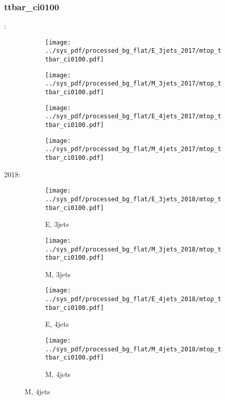 \documentclass{beamer}
\begin{document}
\begin{frame}
\frametitle{ttbar_ci0100}
\fontsize{5}{1}:
\begin{figure}
\centering
\begin{subfigure}[b]{0.24\textwidth}
\texttt{[image: ../sys\_pdf/processed\_bg\_flat/E\_3jets\_2017/mtop\_ttbar\_ci0100.pdf]}
\end{subfigure}
\begin{subfigure}[b]{0.24\textwidth}
\texttt{[image: ../sys\_pdf/processed\_bg\_flat/M\_3jets\_2017/mtop\_ttbar\_ci0100.pdf]}
\end{subfigure}
\begin{subfigure}[b]{0.24\textwidth}
\texttt{[image: ../sys\_pdf/processed\_bg\_flat/E\_4jets\_2017/mtop\_ttbar\_ci0100.pdf]}
\end{subfigure}
\begin{subfigure}[b]{0.24\textwidth}
\texttt{[image: ../sys\_pdf/processed\_bg\_flat/M\_4jets\_2017/mtop\_ttbar\_ci0100.pdf]}
\end{subfigure}
\end{figure}
2018:
\begin{figure}
\centering
\begin{subfigure}[b]{0.24\textwidth}
\texttt{[image: ../sys\_pdf/processed\_bg\_flat/E\_3jets\_2018/mtop\_ttbar\_ci0100.pdf]}
\captionsetup{font=tiny}
\caption{E, 3jets}
\end{subfigure}
\begin{subfigure}[b]{0.24\textwidth}
\texttt{[image: ../sys\_pdf/processed\_bg\_flat/M\_3jets\_2018/mtop\_ttbar\_ci0100.pdf]}
\captionsetup{font=tiny}
\caption{M, 3jets}
\end{subfigure}
\begin{subfigure}[b]{0.24\textwidth}
\texttt{[image: ../sys\_pdf/processed\_bg\_flat/E\_4jets\_2018/mtop\_ttbar\_ci0100.pdf]}
\captionsetup{font=tiny}
\caption{E, 4jets}
\end{subfigure}
\begin{subfigure}[b]{0.24\textwidth}
\texttt{[image: ../sys\_pdf/processed\_bg\_flat/M\_4jets\_2018/mtop\_ttbar\_ci0100.pdf]}
\captionsetup{font=tiny}
\caption{M, 4jets}
\end{subfigure}
\end{figure}
\end{frame}
\end{document}
